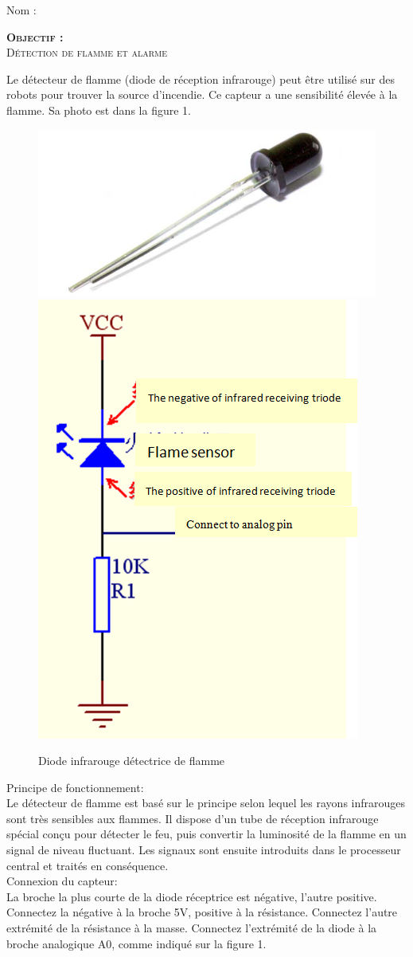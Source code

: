 \documentclass[a4paper, 11pt]{article}           %
\newcommand{\objectif}[1]{\textsc{\huge \textbf{Objectif :}\\[2mm] #1} }
\begin{document}
\sffamily
\hfill Nom : {\noindent\makebox[5cm]{\dotfill}\endgraf}

\objectif{Détection de flamme et alarme}

Le détecteur de flamme (diode de réception infrarouge) peut être utilisé sur des robots pour trouver la source d'incendie. Ce capteur a une sensibilité élevée à la flamme. Sa photo est dans la figure 1.
\begin{figure}[!h]
\begin{center}
\includegraphics[width=.65\textwidth]{detecteur_flamme}
\includegraphics[width=.3\textwidth]{DiodeCircuit}
\label{FigDiodeFlamme}
\caption{Diode infrarouge détectrice de flamme}
\end{center}
\end{figure}


Principe de fonctionnement:\\
Le détecteur de flamme est basé sur le principe selon lequel les rayons infrarouges sont très sensibles aux flammes. Il dispose d'un tube de réception infrarouge spécial conçu pour détecter le feu, puis convertir la luminosité de la flamme en un signal de niveau fluctuant. Les signaux sont ensuite introduits dans le processeur central et traités en conséquence.\\

Connexion du capteur:\\
La broche la plus courte de la diode réceptrice est négative, l'autre positive. Connectez la négative à la broche 5V, positive à la résistance. Connectez l'autre extrémité de la résistance à la masse. Connectez l'extrémité de la diode à la broche analogique A0, comme indiqué sur la figure 1.\\
\end{document}
